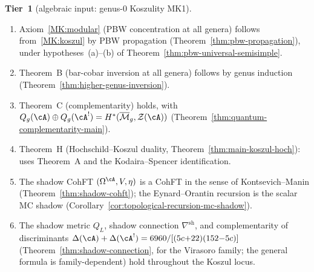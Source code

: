 \begin{theorem}
\smallskip\noindent
\textbf{Tier~1} \textup{(algebraic input:
genus-$0$ Koszulity \textup{MK1})}.
\begin{enumerate}[label=\textup{(1.\arabic*)}]
\item Axiom~\ref{MK:modular} \textup{(}PBW
  concentration at all genera\textup{)} follows
  from~\ref{MK:koszul} by PBW propagation
  \textup{(Theorem~\ref{thm:pbw-propagation})},
  under hypotheses~\textup{(a)--(b)} of
  Theorem~\textup{\ref{thm:pbw-universal-semisimple}}.
\item Theorem~B \textup{(}bar-cobar inversion at
  all genera\textup{)} follows by genus induction
  \textup{(Theorem~\ref{thm:higher-genus-inversion})}.
\item Theorem~C \textup{(}complementarity\textup{)}
  holds, with $Q_g(\cA) \oplus Q_g(\cA^!)
  = H^*(\overline{\mathcal{M}}_g,
  \mathcal{Z}(\cA))$
  \textup{(Theorem~\ref{thm:quantum-complementarity-main})}.
\item Theorem~H \textup{(}Hochschild--Koszul duality,
  Theorem~\textup{\ref{thm:main-koszul-hoch}}\textup{)}:
  uses Theorem~A and the Kodaira--Spencer identification.
\item The shadow CohFT
  $(\Omega^\cA, V, \eta)$ is a CohFT in the
  sense of Kontsevich--Manin
  \textup{(Theorem~\ref{thm:shadow-cohft})}; the
  Eynard--Orantin recursion is the scalar MC shadow
  \textup{(Corollary~\ref{cor:topological-recursion-mc-shadow})}.
\item The shadow metric $Q_L$, shadow connection
  $\nabla^{\mathrm{sh}}$, and complementarity of
  discriminants
  $\Delta(\cA) + \Delta(\cA^!) =
  6960/[(5c{+}22)(152{-}5c)]$
  \textup{(}Theorem~\ref{thm:shadow-connection},
  for the Virasoro family; the general formula is
  family-dependent\textup{)} hold
  throughout the Koszul locus.
\end{enumerate}


\end{theorem}
